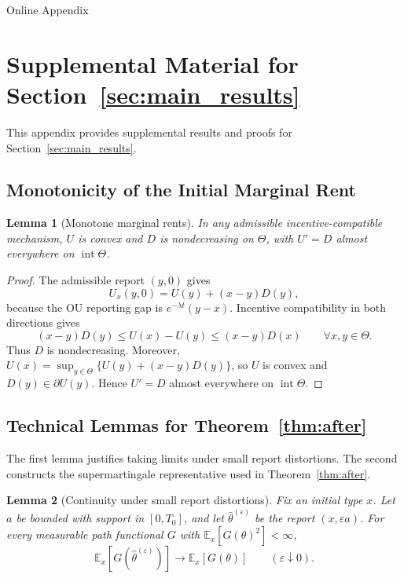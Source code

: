 \documentclass[12pt]{article}
\newtheorem{lemma}{Lemma}
\newcommand{\E}{\mathbb{E}}
\newcommand{\hth}{\hat\theta}
\begin{document}
\Large{\textsf{Online Appendix}}
\normalsize

\section{Supplemental Material for Section~\ref{sec:main_results}}
\label{app:supp-main-results}

This appendix provides supplemental results and proofs for
Section~\ref{sec:main_results}.

\subsection{Monotonicity of the Initial Marginal Rent}
\label{app:monotone-rents}

\begin{lemma}[Monotone marginal rents]\label{lem:monotone-rents}
In any admissible incentive-compatible mechanism, \(U\) is convex
and \(D\) is nondecreasing on \(\Theta\), with \(U'=D\) almost
everywhere on \(\operatorname{int}\Theta\).
\end{lemma}

\begin{proof}
The admissible report \((y,0)\) gives
\[
  U_x(y,0)=U(y)+(x-y)D(y),
\]
because the OU reporting gap is \(e^{-\lambda t}(y-x)\).
Incentive compatibility in both directions gives
\[
  (x-y)D(y)\leq U(x)-U(y)\leq(x-y)D(x)
  \qquad\forall x,y\in\Theta.
\]
Thus \(D\) is nondecreasing. Moreover,
\(U(x)=\sup_{y\in\Theta}\{U(y)+(x-y)D(y)\}\), so \(U\) is convex
and \(D(y)\in\partial U(y)\). Hence \(U'=D\) almost everywhere on
\(\operatorname{int}\Theta\).
\end{proof}

\subsection{Technical Lemmas for Theorem~\ref{thm:after}}
\label{app:lemmas-after}
The first lemma justifies taking limits under small report
distortions. The second constructs the supermartingale representative
used in Theorem~\ref{thm:after}.

\begin{lemma}[Continuity under small report distortions]\label{lem:direction}
Fix an initial type \(x\). Let \(a\) be bounded with support in
\([0,T_0]\), and let \(\hth^{(\varepsilon)}\) be the report
\((x,\varepsilon a)\). For every measurable path functional \(G\)
with \(\E_x[G(\theta)^2]<\infty\),
\[
  \E_x[G(\hth^{(\varepsilon)})]
  \longrightarrow\E_x[G(\theta)]
  \qquad(\varepsilon\downarrow0).
\]
\end{lemma}
\end{document}
